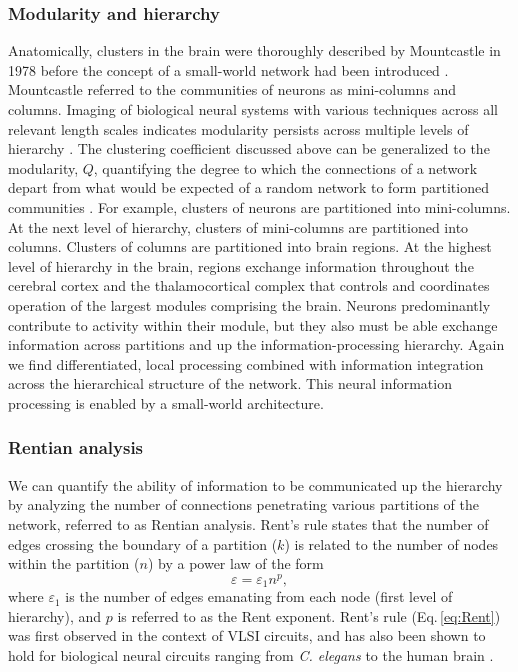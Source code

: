 \documentclass[twocolumn]{article}
\begin{document}
\subsubsection{Modularity and hierarchy}
Anatomically, clusters in the brain were thoroughly described by Mountcastle in 1978 \cite{mo1978} before the concept of a small-world network had been introduced \cite{wast1998}. Mountcastle referred to the communities of neurons as mini-columns and columns. Imaging of biological neural systems with various techniques across all relevant length scales indicates modularity persists across multiple levels of hierarchy \cite{beba2017}. The clustering coefficient discussed above can be generalized to the modularity, $Q$, quantifying the degree to which the connections of a network depart from what would be expected of a random network to form partitioned communities \cite{rusp2010,beba2017}. For example, clusters of neurons are partitioned into mini-columns. At the next level of hierarchy, clusters of mini-columns are partitioned into columns. Clusters of columns are partitioned into brain regions. At the highest level of hierarchy in the brain, regions exchange information throughout the cerebral cortex and the thalamocortical complex that controls and coordinates operation of the largest modules comprising the brain. Neurons predominantly contribute to activity within their module, but they also must be able exchange information across partitions and up the information-processing hierarchy. Again we find differentiated, local processing combined with information integration across the hierarchical structure of the network. This neural information processing is enabled by a small-world architecture.

\subsubsection{Rentian analysis}
We can quantify the ability of information to be communicated up the hierarchy by analyzing the number of connections penetrating various partitions of the network, referred to as Rentian analysis. Rent's rule states that the number of edges crossing the boundary of a partition ($k$) is related to the number of nodes within the partition ($n$) by a power law of the form
\begin{equation}
\label{eq:Rent}
\varepsilon = \varepsilon_1 n^p,
\end{equation}
where $\varepsilon_1$ is the number of edges emanating from each node (first level of hierarchy), and $p$ is referred to as the Rent exponent. Rent's rule (Eq.\,\ref{eq:Rent}) was first observed in the context of VLSI circuits, and has also been shown to hold for biological neural circuits ranging from \textit{C. elegans} to the human brain \cite{bagr2010}. 
\end{document}
